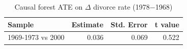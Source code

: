 \begin{table}[!htbp]\centering
\caption{Causal forest ATE on $\Delta$ divorce rate (1978$-$1968)}
\label{tab:ex2a_ate}
\begin{tabular}{lrrr}
\toprule
Sample & Estimate & Std. Error & t value \\
\midrule
1969-1973 vs 2000 & 0.036 & 0.069 & 0.522 \\
\bottomrule
\end{tabular}
\end{table}
